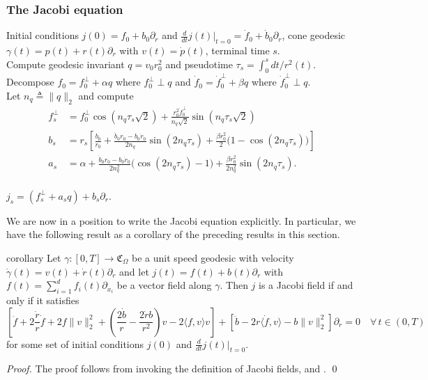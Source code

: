 \documentclass[11pt]{article}
\begin{document}
\subsubsection{The Jacobi equation}

\begin{algorithm}[H]
    \begin{algorithmic}[1]
        \caption{Jacobi field on $\mathfrak{C}_\Omega$}
        \label{alg: jacobi field}
        \Require Initial conditions $j(0) = f_0 + b_0\partial_r$ and $\frac{d}{dt}j(t)|_{t = 0} = \dot f_0 + \dot b_0 \partial_r$, cone geodesic $\gamma(t) = p(t) + r(t)\partial_r$ with $v(t) = \dot p(t)$, terminal time $s$.\\
        Compute geodesic invariant $q = v_0r_0^2$ and pseudotime $\tau_s = \int_0^sdt/r^2(t)$. \\
        Decompose $f_0 = f_{0}^{\perp} + \alpha q$ where $f_{0}^{\perp} \perp q$ and $\dot f_0 = \dot f_{0}^{\perp} + \beta q$ where $\dot f_{0}^\perp \perp q$.\\
        Let $n_q \triangleq \|q\|_2$ and compute 
        \begin{align*}
        f^{\perp}_s &= f_{0}^\perp\cos\left(n_q\tau_s\sqrt{2}
        \right) + \frac{r_0^2\dot f_{0}^{\perp}}{n_q\sqrt{2}}\sin\left(n_q\tau_s\sqrt{2}\right) \\
        b_s &= r_s\left[\frac{b_0}{r_0} + \frac{\dot b_0r_0 - b_0\dot r_0}{2n_q}\sin\left(2n_q\tau_s\right) + \frac{\beta r_0^2}{2} \Big(1- \cos\left(2n_q\tau_s\right)\Big)\right] \\
        a_s &= \alpha + \frac{\dot b_0r_0 - b_0\dot r_0}{2n_q^2}\Big(\cos(2n_q\tau_s)-1\Big) + \frac{\beta r_0^2}{2n_q^2}\sin(2n_q\tau_s).
        \end{align*}
        \\ \Return $j_s = \left(f^{\perp}_s + a_sq\right) + b_s\partial_r$.
    \end{algorithmic}
\end{algorithm}

We are now in a position to write the Jacobi equation explicitly. In particular, we have the following result as a corollary of the preceding results in this section.

\begin{restatable}{corollary}{} \label{full jacobi equation}
    Let $\gamma:[0, T] \rightarrow \mathfrak{C}_\Omega$ be a unit speed geodesic with velocity $\dot \gamma(t) = v(t) + \dot r(t)\partial_r$ and let $j(t) = f(t) + b(t)\partial_r$ with $f(t) = \sum_{i = 1}^df_i(t)\partial_{x_i}$ be a vector field along $\gamma$. Then $j$ is a Jacobi field if and only if it satisfies 
    \[\left[\ddot f + 2\frac{\dot r}{r}\dot f + 2f\|v\|_2^2  + \left(\frac{2\dot b}{r} - \frac{2 \dot rb}{r^2}\right)v - 2\langle f,v\rangle v\right] + \left[\ddot b - 2r\langle \dot f, v\rangle - b\|v\|_2^2\right]\partial_r = 0 \quad \forall \,t \in (0, T)\]
    for some set of initial conditions $j(0)$ and $\frac{d}{dt}j(t)|_{t = 0}$.
\end{restatable}
\noindent \textit{Proof.} The proof follows from invoking the definition of Jacobi fields,  and . \qed{}
\end{document}
